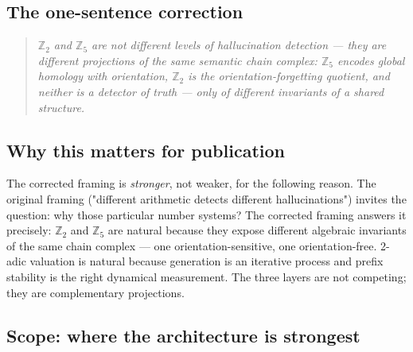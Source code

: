 \documentclass[11pt,a4paper]{article}
\begin{document}
\subsection*{The one-sentence correction}

\begin{quote}
\emph{$\mathbb{Z}_2$ and $\mathbb{Z}_5$ are not different levels of
hallucination detection --- they are different projections of the same
semantic chain complex: $\mathbb{Z}_5$ encodes global homology with
orientation, $\mathbb{Z}_2$ is the orientation-forgetting quotient, and
neither is a detector of truth --- only of different invariants of a
shared structure.}
\end{quote}

\subsection*{Why this matters for publication}

The corrected framing is \emph{stronger}, not weaker, for the following reason.
The original framing ("different arithmetic detects different hallucinations")
invites the question: why those particular number systems?
The corrected framing answers it precisely: $\mathbb{Z}_2$ and $\mathbb{Z}_5$
are natural because they expose different algebraic invariants of the same
chain complex --- one orientation-sensitive, one orientation-free.
2-adic valuation is natural because generation is an iterative process
and prefix stability is the right dynamical measurement.
The three layers are not competing; they are complementary projections.

\subsection{Scope: where the architecture is strongest}
\end{document}
